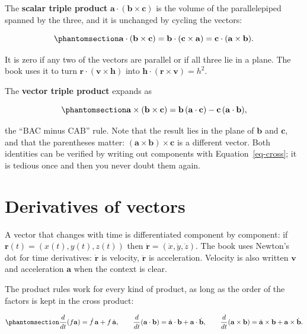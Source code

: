 \documentclass[
  10.5pt,
  letterpaper,
]{scrbook}
\theoremstyle{plain}
\theoremstyle{remark}
\begin{document}
The \textbf{scalar triple product}
\(\mathbf{a}\cdot(\mathbf{b}\times\mathbf{c})\) is the volume of the
parallelepiped spanned by the three, and it is unchanged by cycling the
vectors:

\begin{equation}\protect\phantomsection\label{eq-scalar-triple}{
\mathbf{a}\cdot(\mathbf{b}\times\mathbf{c}) = \mathbf{b}\cdot(\mathbf{c}\times\mathbf{a}) = \mathbf{c}\cdot(\mathbf{a}\times\mathbf{b}).
}\end{equation}

It is zero if any two of the vectors are parallel or if all three lie in
a plane. The book uses it to turn
\(\mathbf{r}\cdot(\mathbf{v}\times\mathbf{h})\) into
\(\mathbf{h}\cdot(\mathbf{r}\times\mathbf{v}) = h^2\).

The \textbf{vector triple product} expands as

\begin{equation}\protect\phantomsection\label{eq-vector-triple}{
\mathbf{a}\times(\mathbf{b}\times\mathbf{c}) = \mathbf{b}\,(\mathbf{a}\cdot\mathbf{c}) - \mathbf{c}\,(\mathbf{a}\cdot\mathbf{b}),
}\end{equation}

the ``BAC minus CAB'' rule. Note that the result lies in the plane of
\(\mathbf{b}\) and \(\mathbf{c}\), and that the parentheses matter:
\((\mathbf{a}\times\mathbf{b})\times\mathbf{c}\) is a different vector.
Both identities can be verified by writing out components with
Equation~\ref{eq-cross}; it is tedious once and then you never doubt
them again.

\section{Derivatives of vectors}\label{derivatives-of-vectors}

A vector that changes with time is differentiated component by
component: if \(\mathbf{r}(t) = (x(t), y(t), z(t))\) then
\(\dot{\mathbf{r}} = (\dot x, \dot y, \dot z)\). The book uses Newton's
dot for time derivatives: \(\dot{\mathbf{r}}\) is velocity,
\(\ddot{\mathbf{r}}\) is acceleration. Velocity is also written
\(\mathbf{v}\) and acceleration \(\mathbf{a}\) when the context is
clear.

The product rules work for every kind of product, as long as the order
of the factors is kept in the cross product:

\begin{equation}\protect\phantomsection\label{eq-vector-product-rules}{
\frac{d}{dt}(f\mathbf{a}) = \dot f\,\mathbf{a} + f\,\dot{\mathbf{a}}, \qquad
\frac{d}{dt}(\mathbf{a}\cdot\mathbf{b}) = \dot{\mathbf{a}}\cdot\mathbf{b} + \mathbf{a}\cdot\dot{\mathbf{b}}, \qquad
\frac{d}{dt}(\mathbf{a}\times\mathbf{b}) = \dot{\mathbf{a}}\times\mathbf{b} + \mathbf{a}\times\dot{\mathbf{b}}.
}\end{equation}
\end{document}
